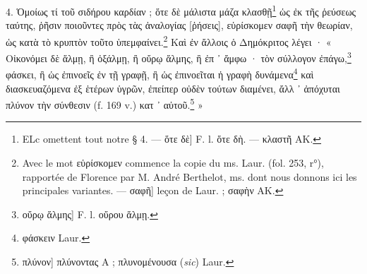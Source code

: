\documentclass[a4paper, 11pt, oneside, polutonikogreek, french]{article}
\begin{document}
4. Ὁμοίως τί τοῦ σιδήρου καρδίαν ; ὅτε δὲ μάλιστα μάζα κλασθῇ\footnote{ELc omettent tout notre § 4. --- ὅτε δὲ] F. l. ὅτε δὴ. --- κλαστῆ AΚ.} ὡς ἐκ τῆς ῥεύσεως ταύτης, ῥῆσιν ποιοῦντες πρὸς τὰς ἀναλογίας [ῥήσεις], εὑρίσκομεν σαφῆ τὴν θεωρίαν, ὡς κατὰ τὸ κρυπτὸν τοῦτο ὑπεμφαίνει.\footnote{Avec le mot εὑρίσκομεν commence la copie du ms. Laur. (fol. 253, r°), rapportée de Florence par M. André Berthelot, ms. dont nous donnons ici les principales variantes. --- σαφῆ] leçon de Laur. ; σαφὴν AK.} Καὶ ἐν ἄλλοις ὁ Δημόκριτος λέγει · « Οἰκονόμει δὲ ἅλμῃ, ἢ ὀξάλμῃ, ἢ οὔρῳ ἅλμης, ἢ ἐπ ᾽ ἄμφω · τὸν σύλλογον ἐπάγω,\footnote{οὔρῳ ἅλμης] F. l. οὔρου ἅλμῃ.} φάσκει, ἢ ὡς ἐπινοεῖς ἐν τῇ γραφῇ, ἢ ὡς ἐπινοεῖται ἡ γραφὴ δυνάμενα\footnote{φάσκειν Laur.} καὶ διασκευαζόμενα ἐξ ἑτέρων ὑγρῶν, ἐπείπερ οὐδὲν τούτων διαμένει, ἄλλ ᾽ ἀπόχυται πλύνον τὴν σύνθεσιν (f. 169 v.) κατ ᾽ αὐτοῦ.\footnote{πλύνον] πλύνοντας A ; πλυνομένουσα (\emph{sic}) Laur.} »
\end{document}
